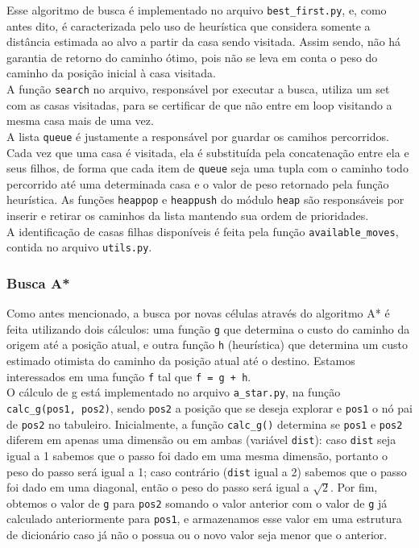\documentclass[12pt]{article}
\begin{document}
Esse algoritmo de busca é implementado no arquivo \verb|best_first.py|, e, como antes dito, é caracterizada pelo uso de heurística que considera somente a distância estimada ao alvo a partir da casa sendo visitada. Assim sendo, não há garantia de retorno do caminho ótimo, pois não se leva em conta o peso do caminho da posição inicial à casa visitada.\\

A função \verb|search| no arquivo, responsável por executar a busca, utiliza um set com as casas visitadas, para se certificar de que não entre em loop visitando a mesma casa mais de uma vez.\\

A lista \verb|queue| é justamente a responsável por guardar os camihos percorridos. Cada vez que uma casa é visitada, ela é substituída pela concatenação entre ela e seus filhos, de forma que cada item de \verb|queue| seja uma tupla com o caminho todo percorrido até uma determinada casa e o valor de peso retornado pela função heurística. As funções \verb|heappop| e \verb|heappush| do módulo \verb|heap| são responsáveis por inserir e retirar os caminhos da lista mantendo sua ordem de prioridades.\\

A identificação de casas filhas disponíveis é feita pela função \verb|available_moves|, contida no arquivo \verb|utils.py|.

\subsubsection{Busca A*}
Como antes mencionado, a busca por novas células através do algoritmo A* é feita utilizando dois cálculos: uma função \verb|g| que determina o custo do caminho da origem até a posição atual, e outra função \verb|h| (heurística) que determina um custo estimado otimista do caminho da posição atual até o destino. Estamos interessados em uma função \verb|f| tal que \verb|f = g + h|.\\

O cálculo de g está implementado no arquivo \verb|a_star.py|, na função \verb|calc_g(pos1, pos2)|, sendo \verb|pos2| a posição que se deseja explorar e \verb|pos1| o nó pai de \verb|pos2| no tabuleiro. Inicialmente, a função \verb|calc_g()| determina se \verb|pos1| e \verb|pos2| diferem em apenas uma dimensão ou em ambas (variável \verb|dist|): caso \verb|dist| seja igual a 1 sabemos que o passo foi dado em uma mesma dimensão, portanto o peso do passo será igual a 1; caso contrário (\verb|dist| igual a 2) sabemos que o passo foi dado em uma diagonal, então o peso do passo será igual a \(\sqrt{2}\). Por fim, obtemos o valor de \verb|g| para \verb|pos2| somando o valor anterior com o valor de \verb|g| já calculado anteriormente para \verb|pos1|, e armazenamos esse valor em uma estrutura de dicionário caso já não o possua ou o novo valor seja menor que o anterior.\\
\end{document}
